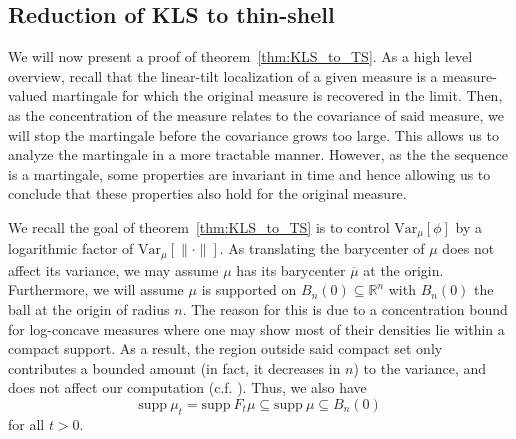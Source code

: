 \subsection{Reduction of KLS to thin-shell}

We will now present a proof of theorem~\ref{thm:KLS_to_TS}.
As a high level overview, recall that the linear-tilt localization of a given measure is a measure-valued martingale
for which the original measure is recovered in the limit. Then, as the concentration of the measure 
relates to the covariance of said measure, we will stop the martingale before the covariance grows too large. 
This allows us to analyze the martingale in a more tractable manner. However, as the the sequence is 
a martingale, some properties are invariant in time and hence allowing us to conclude that these properties 
also hold for the original measure.

We recall the goal of theorem~\ref{thm:KLS_to_TS} is to control \(\text{Var}_\mu[\phi]\) by 
a logarithmic factor of \(\text{Var}_\mu[\|\cdot\|]\). As translating the barycenter of \(\mu\)
does not affect its variance, we may assume \(\mu\) has its barycenter \(\overline{\mu}\) at the origin.
Furthermore, we will assume \(\mu\) is supported on \(B_n(0) \subseteq \mathbb{R}^n\) with 
\(B_n(0)\) the ball at the origin of radius \(n\). The reason for this is due to a concentration 
bound for log-concave measures where one may show most of their densities lie within a compact support.
As a result, the region outside said compact set only contributes a bounded amount (in fact, it decreases 
in \(n\)) to the variance, and does not affect our computation (c.f. \cite{Klartag_2006}). 
Thus, we also have 
\[\text{supp}\ \mu_t = \text{supp}\ F_t\mu \subseteq \text{supp}\ \mu \subseteq B_n(0)\] 
for all \(t > 0\).
 
